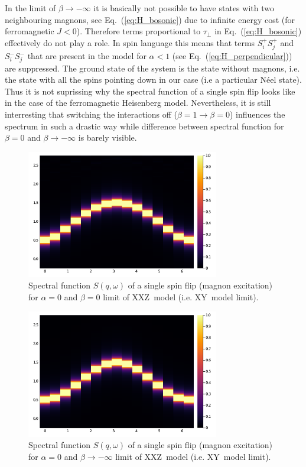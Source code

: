 \documentclass[12pt, a4paper]{article}
\begin{document}
In the limit of $\beta \to -\infty$ it is basically not possible to have states with two neighbouring magnons, see Eq.~(\ref{eq:H_bosonic}) due to infinite energy cost (for ferromagnetic $J<0$). Therefore terms proportional to $\tau_{\perp}$ in Eq.~(\ref{eq:H_bosonic}) effectively do not play a role. In spin language this means that terms $S_i^+ S_j^+$ and $S_i^- S_j^-$ that are present in the model for $\alpha < 1$ (see Eq.~(\ref{eq:H_perpendicular})) are suppressed. The ground state of the system is the state without magnons, i.e. the state with all the spins pointing down in our case (i.e a particular N\'eel state). Thus it is not suprissing why the spectral function of a single spin flip looks like in the case of the ferromagnetic Heisenberg model. Nevertheless, it is still interresting that switching the interactions off ($\beta = 1 \rightarrow \beta = 0$) influences the spectrum in such a drastic way while difference between spectral function for $\beta = 0$ and $\beta \to -\infty$ is barely visible.
\begin{figure}[ht]
	\centering
	\includegraphics[width=0.75\textwidth]{../figures/fig002.png}
	\caption{Spectral function $S(q,\omega)$ of a single spin flip (magnon excitation) for $\alpha = 0$ and $\beta = 0$ limit of XXZ~model (i.e. XY~model limit).}\label{fig:XY_noint}
\end{figure}
\begin{figure}[h!]
	\centering
	\includegraphics[width=0.75\textwidth]{../figures/fig003.png}
	\caption{Spectral function $S(q,\omega)$ of a single spin flip (magnon excitation) for $\alpha = 0$ and $\beta \to -\infty$ limit of XXZ~model (i.e. XY~model limit).}\label{fig:XY_limit}
\end{figure}
\end{document}
